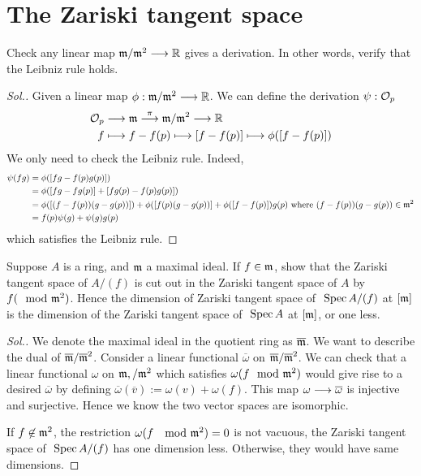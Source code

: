 \documentclass[11pt]{book} %
\begin{document}
\section{The Zariski tangent space}
\begin{exr}
Check any linear map ${\mathfrak m}/{\mathfrak m}^2\longrightarrow \mathbb R$ gives a derivation. In other words, verify that the Leibniz rule holds.
\end{exr}
\begin{proof}[Sol.]
Given a linear map $\phi:{\mathfrak m}/{\mathfrak m}^2\longrightarrow \mathbb R$. We can define the derivation $\psi:{\cal O}_p$
$$
\begin{aligned}
{\cal O}_p &\longrightarrow {\mathfrak m}\overset{\pi}{\longrightarrow}{\mathfrak m}/{\mathfrak m}^2\longrightarrow\mathbb R\\
f&\longmapsto f-f(p)\longmapsto[f-f(p)]\longmapsto\phi([f-f(p)])
\end{aligned}
$$
We only need to check the Leibniz rule. Indeed,
$$
\begin{aligned}
\psi(fg)&=\phi([fg-f(p)g(p)])\\
&=\phi([fg-f g(p)]+[f g(p)-f(p)g(p)])\\
&=\phi([(f-f(p))(g- g(p))])+\phi([f(p)(g-g(p))]+\phi([f-f(p)])g(p)\text{ where $(f-f(p))(g- g(p))\in {\mathfrak m}^2$}\\
&=f(p)\psi(g)+\psi(g)g(p)
\end{aligned}
$$
which satisfies the Leibniz rule.
\end{proof}
\begin{exr}
Suppose $A$ is a ring, and ${\mathfrak m}$ a maximal ideal. If $f\in {\mathfrak m}$, show that the Zariski tangent space of $A/(f)$ is cut out in the Zariski tangent space of $A$ by $f(\mod {{\mathfrak m}}^2)$. Hence the dimension of Zariski tangent space of $\text{ Spec\,} A/(f)$ at $[{\mathfrak m}]$ is the dimension of the Zariski tangent space of $\text{ Spec\,} A$ at $[{\mathfrak m}]$, or one less.
\end{exr}
\begin{proof}[Sol.]
We denote the maximal ideal in the quotient ring as $\overline{{\mathfrak m}}$. We want to describe the dual of $\overline{{\mathfrak m}}/\overline{{\mathfrak m}}^2$. Consider a linear functional $\overline{\omega}$ on $\overline{{\mathfrak m}}/\overline{{\mathfrak m}}^2$. We can check that a linear functional $\omega$ on ${\mathfrak m},/{\mathfrak m}^2$ which satisfies $\omega(f\mod {{\mathfrak m}}^2)$ would give rise to a desired $\overline{\omega}$ by defining $\overline{\omega}(\overline{v}):=\omega(v)+\omega(f)$. This map $\omega\longrightarrow \overline{\omega}$ is injective and surjective. Hence we know the two vector spaces are isomorphic.

If $f\not \in{\mathfrak m}^2$, the restriction $\omega(f\ \mod {{\mathfrak m}}^2)=0$ is not vacuous, the Zariski tangent space of $\text{ Spec\,} A/(f)$ has one dimension less. Otherwise, they would have same dimensions.
\end{proof}
\end{document}
